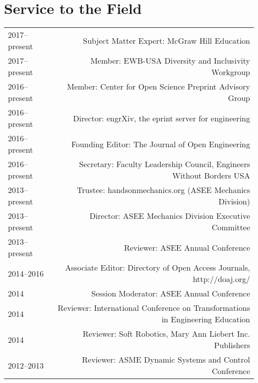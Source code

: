 \section*{Service to the Field}
\begin{tabular}{L!{\VRule}R}
2017--present&Subject Matter Expert: McGraw Hill Education\\
2017--present&Member: EWB-USA Diversity and Inclusivity Workgroup\\
2016--present&Member: Center for Open Science Preprint Advisory Group\\
2016--present&Director: engrXiv, the eprint server for engineering\\
2016--present&Founding Editor: The Journal of Open Engineering\\
2016--present&Secretary: Faculty Leadership Council, Engineers Without Borders USA\\
2013--present&Trustee: handsonmechanics.org (ASEE Mechanics Division)\\
2013--present&Director: ASEE Mechanics Division Executive Committee\\
2013--present&Reviewer: ASEE Annual Conference\\
2014--2016&Associate Editor: Directory of Open Access Journals, http://doaj.org/\\
2014&Session Moderator: ASEE Annual Conference\\
2014&Reviewer: International Conference on Transformations in Engineering Education\\
2014&Reviewer: Soft Robotics, Mary Ann Liebert Inc. Publishers\\
2012--2013&Reviewer: ASME Dynamic Systems and Control Conference\\
\end{tabular}
